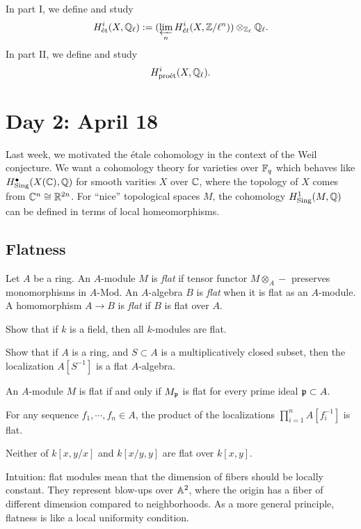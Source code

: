 \documentclass{../../../small}
\begin{document}
In part I, we define and study
\[H_{\mathrm{\acute et}}^i(X,\mathbb{Q}_\ell):=(\varprojlim_nH_{\acute et}^i(X,\mathbb{Z}/\ell^n))\otimes_{\mathbb{Z}_\ell}\mathbb{Q}_\ell.\]
In part II, we define and study
\[H_{\mathrm{pro\acute et}}^i(X,\mathbb{Q}_\ell).\]


\newpage
\section{Day 2: April 18}

Last week, we motivated the \'etale cohomology in the context of the Weil conjecture.
We want a cohomology theory for varieties over $\mathbb{F}_q$ which behaves like $H_{\mathrm{Sing}}^\bullet(X(\mathbb{C}),\mathbb{Q})$ for smooth varities $X$ over $\mathbb{C}$, where the topology of $X$ comes from $\mathbb{C}^n\cong\mathbb{R}^{2n}$.
For ``nice'' topological spaces $M$, the cohomology $H_{\mathrm{Sing}}^1(M,\mathbb{Q})$ can be defined in terms of local homeomorphisms.

\subsection{Flatness}
\begin{defn*}
Let $A$ be a ring.
An $A$-module $M$ is \emph{flat} if tensor functor $M\otimes_A-$ preserves monomorphisms in $A$-$\mathrm{Mod}$.
An $A$-algebra $B$ is \emph{flat} when it is flat as an $A$-module.
A homomorphism $A\to B$ is \emph{flat} if $B$ is flat over $A$.
\end{defn*}
\begin{exe*}
Show that if $k$ is a field, then all $k$-modules are flat.
\end{exe*}
\begin{exe*}
Show that if $A$ is a ring, and $S\subset A$ is a multiplicatively closed subset, then the localization $A[S^{-1}]$ is a flat $A$-algebra.
\end{exe*}
\begin{ex*}
An $A$-module $M$ is flat if and only if $M_{\mathfrak{p}}$ is flat for every prime ideal $\mathfrak{p}\subset A$.
\end{ex*}
\begin{ex*}
For any sequence $f_1,\cdots,f_n\in A$, the product of the localizations $\prod_{i=1}^nA[f_i^{-1}]$ is flat.
\end{ex*}
\begin{ex*}
Neither of $k[x,y/x]$ and $k[x/y,y]$ are flat over $k[x,y]$.

Intuition: flat modules mean that the dimension of fibers should be locally constant.
They represent blow-ups over $\mathbb{A}^2$, where the origin has a fiber of different dimension compared to neighborhoods.
As a more general principle, flatness is like a local uniformity condition.
\end{ex*}
\end{document}
